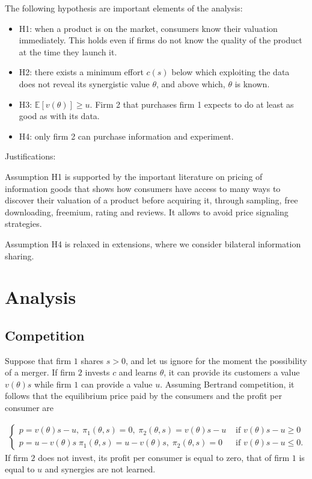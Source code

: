 \documentclass[a4paper,leqno]{article}%
\renewcommand{\t}{\theta}
\newcommand{\E}{\mathbb E}
\renewcommand{\t}{\theta}
\begin{document}
The following hypothesis are important elements of the analysis:

\begin{itemize}[label={--}]
    \item H1: when a product is on the market, consumers know their valuation immediately. This holds even if firms do not know the quality of the product at the time they launch it. 
    \item H2: there exists a minimum effort $c(s)$ below which exploiting the data does not reveal its synergistic value $\t$, and above which, $\t$ is known.
    \item H3: $\E[v(\t)]\geq u$. Firm 2 that purchases firm 1 expects to do at least as good as with its data. 
    \item H4: only firm 2 can purchase information and experiment.
\end{itemize}

Justifications:

Assumption H1 is supported by the important literature on pricing of information goods \citep{shapiro1998information} that shows how consumers have access to many ways to discover their valuation of a product before acquiring it, through sampling, free downloading, freemium, rating and reviews. It allows to avoid price signaling strategies.

Assumption H4 is relaxed in extensions, where we consider bilateral information sharing. 


\section{Analysis}

\subsection{Competition}


Suppose that firm $1$ shares $s>0$, and let us ignore for the moment the possibility of a merger. If firm $2$ invests $c$ and learns $\t$, it can provide its customers a value $v(\t)s$ while firm $1$ can provide a value $u$. Assuming Bertrand competition, it follows that the equilibrium price paid by the consumers and the profit per consumer are

\begin{align}\label{comp}
\begin{cases}
    p=v(\t)s-u,\; \pi_1(\t,s)=0,\; \pi_2(\t,s)=v(\t)s-u & \text{ if }v(\t)s-u\geq 0\\ 
    p=u-v(\t)s\; \pi_1(\t,s)=u-v(\t)s,\; \pi_2(\t,s)=0 & \text{ if }v(\t)s-u\leq 0.
\end{cases}
\end{align}
If firm $2$ does not invest, its profit per consumer is equal to zero, that of firm $1$ is equal to $u$ and synergies are not learned.
\end{document}
